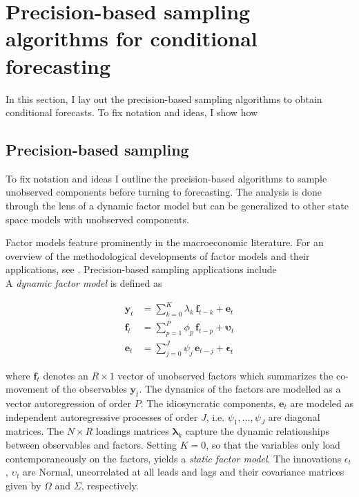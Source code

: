 \documentclass[notitlepage,a4paper,12pt]{article}
\begin{document}
\section{Precision-based sampling algorithms for conditional forecasting}\label{sec:precsampler}

In this section, I lay out the precision-based sampling algorithms to obtain conditional forecasts. To fix notation and ideas, I show how 
\subsection{Precision-based sampling}\label{subsec:precsampler}

To fix notation and ideas I outline the precision-based algorithms to sample unobserved components before turning to forecasting. The analysis is done through the lens of a dynamic factor model but can be generalized to other state space models with unobserved components.

Factor models feature prominently in the macroeconomic literature. For an overview of the methodological developments of factor models and their applications, see \citet{stockwatson2016_hbmacro}. Precision-based sampling applications include \citet{chanjeliazkov_2009,mccausland_factor2015,kaufmannschumacher_jae2017,kaufmannschumacher_jectrcs2019}\\

A \textit{dynamic factor model} is defined as

\begin{subequations}
    \label{eqn:factormodel}
    \begin{align}
        \mathbf{y}_t &= \sum_{k=0}^K \lambda_k \, \mathbf{f}_{t-k} + \mathbf{e}_t \label{eqn:facmod_obs}\\ 
        \mathbf{f}_t &= \sum_{p=1}^P \phi_p \, \mathbf{f}_{t-p} + \boldsymbol{\upsilon}_t \label{eqn:facmod_factors}\\
        \mathbf{e}_t &= \sum_{j=0}^J \psi_j \, \mathbf{e}_{t-j} + \boldsymbol{\epsilon}_t \label{eqn:facmod_idios}
    \end{align}
\end{subequations}

where $\mathbf{f}_t$ denotes an $R \times 1$ vector of unobserved factors which summarizes the co-movement of the observables $\mathbf{y}_t$. The dynamics of the factors are modelled as a vector autoregression of order $P$. The idiosyncratic components, $\mathbf{e}_t$ are modeled as independent autoregressive processes of order $J$, i.e. $\psi_1, \dots, \psi_J$ are diagonal matrices. The $N \times R$ loadings matrices $\mathbf{\lambda}_k$ capture the dynamic relationships between observables and factors. Setting $K=0$, so that the variables only load contemporaneously on the factors, yields a \textit{static factor model}. The innovations $\epsilon_t$, $\upsilon_t$ are Normal, uncorrelated at all leads and lags and their covariance matrices given by $\Omega$ and $\Sigma$, respectively. \\
\end{document}
